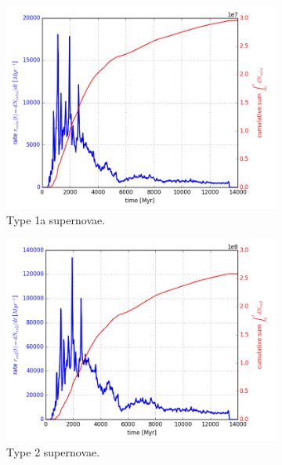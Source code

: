 \begin{figure}
  \centering
  \begin{subfigure}{\subfigwidth}
    \includegraphics[width=\linewidth]{results/MCExperiment_revised_2_delmax/sn1a.png}
    \caption{ \label{fig:MCExperiment-delmax-sn1a}
      Type 1a supernovae.
    }
  \end{subfigure}
  \begin{subfigure}{\subfigwidth}
    \includegraphics[width=\linewidth]{results/MCExperiment_revised_2_delmax/sn2.png}
    \caption{ \label{fig:MCExperiment-delmax-sn2}
      Type 2 supernovae.
    }
  \end{subfigure}
  \begin{subfigure}{\figwidth}

\end{subfigure}
\end{figure}

